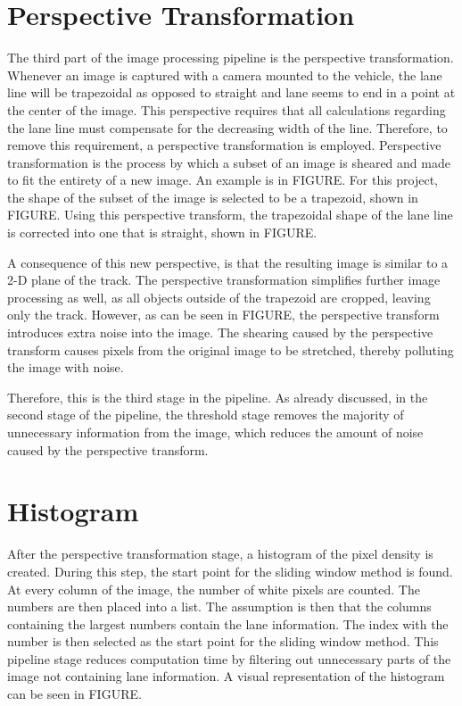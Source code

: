\documentclass[arbeit=studie,oneside,BCOR=12mm]{ArbeitRST}
\begin{document}
\section{Perspective Transformation}
The third part of the image processing pipeline is the perspective 
transformation. 
Whenever an image is captured with a camera mounted to the vehicle, the lane 
line will be trapezoidal as opposed to straight and lane seems to end in a 
point at the center of the image. This perspective requires that all 
calculations 
regarding the lane line must compensate for the decreasing width of the line. 
Therefore, to remove this requirement, a perspective transformation is 
employed. Perspective transformation is the process 
by which a subset of an image is sheared and made to fit the entirety of a new 
image. An example is in FIGURE. For this project, the shape of the subset of 
the 
image is selected to be a trapezoid, shown in FIGURE. 
Using this perspective transform, the trapezoidal shape of the lane line is 
corrected 
into one that is straight, shown in FIGURE.

A consequence of this new perspective, is that the resulting 
image is similar to a 2-D plane of the track. The perspective transformation 
simplifies further image processing as well, as all objects outside of the 
trapezoid 
are cropped, leaving only the track. However, as can be seen in FIGURE, the 
perspective transform introduces extra noise into the image. The shearing 
caused by the perspective transform causes pixels from the original image to 
be stretched, thereby polluting the image with noise. 

Therefore, this is the third stage in the pipeline. As already discussed, in 
the second stage of the pipeline, the threshold stage removes the majority of 
unnecessary information from the image, which reduces the amount of noise 
caused by the perspective transform.
\section{Histogram}
After the perspective transformation stage, a histogram of the pixel density 
is created. During this step, the start point for the sliding window method is
found. 
At every column of the image, the number of white pixels are counted. 
The numbers are then placed into a list. The assumption is then that the 
columns containing the largest numbers contain the lane information. The 
index with the number is then selected as the start point for the sliding 
window method. This pipeline stage reduces computation time by filtering out 
unnecessary parts of the image not containing lane information. A visual 
representation of the histogram can be seen in FIGURE.
\end{document}
